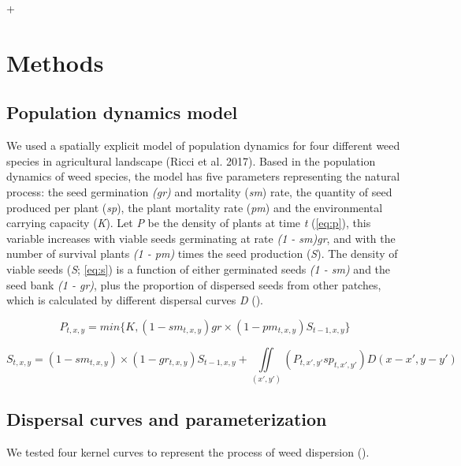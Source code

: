 +\documentclass[12pt]{article}
\begin{document}
\section{Methods}\label{methods}

\subsection{Population dynamics model}\label{population-dynamics-model}

We used a spatially explicit model of population dynamics for four
different weed species in agricultural landscape (Ricci et al. 2017).
Based in the population dynamics of weed species, the model has five
parameters representing the natural process: the seed germination
\emph{(gr)} and mortality (\emph{sm}) rate, the quantity of seed
produced per plant (\emph{sp}), the plant mortality rate (\emph{pm}) and
the environmental carrying capacity (\emph{K}). Let \emph{P} be the
density of plants at time \emph{t} (\cref{eq:p}), this
variable increases with viable seeds germinating at rate \emph{(1 -
sm)gr}, and with the number of survival plants \emph{(1 - pm)} times the
seed production (\emph{S}). The density of viable seeds (\emph{S};
\cref{eq:s}) is a function of either germinated seeds
\emph{(1 - sm)} and the seed bank \emph{(1 - gr)}, plus the proportion
of dispersed seeds from other patches, which is calculated by different
dispersal curves \emph{D} ().

\begin{equation} P_{t,x,y} = min\{K,(1 - sm_{t,x,y})gr\times(1 - pm_{t,x,y})S_{t-1,x,y}\} \label{eq:p}\end{equation}

\begin{equation} S_{t,x,y} = (1 - sm_{t,x,y})\times(1 - gr_{t,x,y})S_{t-1,x,y} + \iint\limits_{(x',y')} (P_{t,x',y'}sp_{t,x',y'})D(x - x', y - y') \label{eq:s}\end{equation}

\subsection{Dispersal curves and
parameterization}\label{dispersal-curves-and-parameterization}

We tested four kernel curves to represent the process of weed dispersion
().
\end{document}
